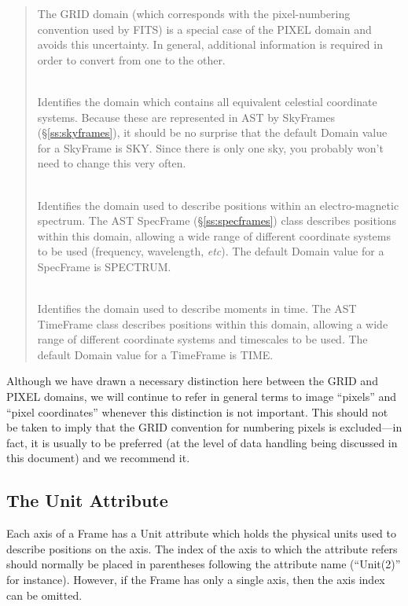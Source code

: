 \documentclass[twoside,11pt]{starlink}
\providecommand{\secref}[1]{\S\ref{#1}}
\begin{document}
\begin{quote}
\begin{description}
The GRID domain (which corresponds with the pixel-numbering convention
used by FITS) is a special case of the PIXEL domain and avoids this
uncertainty. In general, additional information is required in order
to convert from one to the other.

\item[SKY]\mbox{}\\
Identifies the domain which contains all equivalent celestial
coordinate systems. Because these are represented in AST by SkyFrames
(\secref{ss:skyframes}), it should be no surprise that the default
Domain value for a SkyFrame is SKY. Since there is only one sky, you
probably won't need to change this very often.

\item[SPECTRUM]\mbox{}\\
Identifies the domain used to describe positions within an
electro-magnetic spectrum. The AST SpecFrame (\secref{ss:specframes})
class describes positions within this domain, allowing a wide range of
different coordinate systems to be used (frequency, wavelength,
\emph{etc}). The default Domain value for a SpecFrame is SPECTRUM.

\item[TIME]\mbox{}\\
Identifies the domain used to describe moments in time. The AST TimeFrame
class describes positions within this domain, allowing a wide range of
different coordinate systems and timescales to be used. The default Domain
value for a TimeFrame is TIME.

\end{description}
\end{quote}

Although we have drawn a necessary distinction here between the GRID
and PIXEL domains, we will continue to refer in general terms to image
``pixels'' and ``pixel coordinates'' whenever this distinction is not
important. This should not be taken to imply that the GRID convention
for numbering pixels is excluded---in fact, it is usually to be
preferred (at the level of data handling being discussed in this
document) and we recommend it.

\subsection{\label{ss:frameunits}The Unit Attribute}
Each axis of a Frame has a Unit attribute which holds the physical units used
to describe positions on the axis. The index of the axis to which the
attribute refers should normally be placed in parentheses following the
attribute name (``Unit(2)'' for instance). However, if the Frame has only
a single axis, then the axis index can be omitted.
\end{document}
